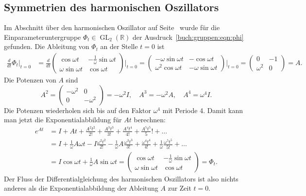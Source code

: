 \subsection{Symmetrien des harmonischen Oszillators
\label{buch:gruppen:symmetrien-harm-osz}}
Im Abschnitt über den harmonischen Oszillator
auf Seite~\pageref{buch:gruppen:harmonischer-oszillator}
wurde für die Einparameteruntergruppe
$\Phi_t\in\operatorname{GL}_2(\mathbb{R})$ der
Ausdruck~\eqref{buch:gruppen:eqn:phi} gefunden.
Die Ableitung von $\Phi_t$ an der Stelle $t=0$ ist
\begin{align*}
\frac{d}{dt}\Phi_t\bigg|_{t=0}
&=
\frac{d}{dt}
\begin{pmatrix}
\cos\omega t&-\frac{1}{\omega}\sin\omega t\\
\omega\sin\omega t&\cos\omega t
\end{pmatrix}
\bigg|_{t=0}
=
\begin{pmatrix}
-\omega\sin\omega t&-\cos\omega t\\
\omega^2\cos\omega t&-\omega\sin\omega t
\end{pmatrix}
\bigg|_{t=0}
=
\begin{pmatrix}
0&-1\\\omega^2&0
\end{pmatrix}
=
A.
\end{align*}
Die Potenzen von $A$ sind
\[
A^2
=
\begin{pmatrix} -\omega^2&0\\0&-\omega^2\end{pmatrix}
=
-\omega^2 I,
\quad
A^3
=
-\omega^2 A,
\quad
A^4
=
\omega^4 I.
\]
Die Potenzen wiederholen sich bis auf den Faktor $\omega^4$ mit Periode 4.
Damit kann man jetzt die Exponentialabbildung für $At$ berechnen:
\begin{align*}
e^{At}
&=
I+At+\frac{A^2t^2}{2!}+\frac{A^3t^3}{3!}+\frac{A^4t^4}{4!}+\frac{A^5t^5}5!+\dots
\\
&=
I+\frac{1}{\omega}A\omega t-I\frac{\omega^2t^2}{2!}
-\frac1{\omega}A\frac{\omega^3t^3}{3!}
+\frac{\omega^4t^4}{4!}
+\frac{1}{\omega}\frac{\omega^5t^5}{5!}+\dots
\\
&= I\cos\omega t + \frac1{\omega}A\sin\omega t
=
\begin{pmatrix}
\cos\omega t       &-\frac{1}{\omega}\sin\omega t\\
\omega\sin\omega t & \cos\omega t
\end{pmatrix} = \Phi_t.
\end{align*}
Der Fluss der Differentialgleichung des harmonischen Oszillators ist
also nichts anderes als die Exponentialabbildung der Ableitung $A$ zur
Zeit $t=0$.

